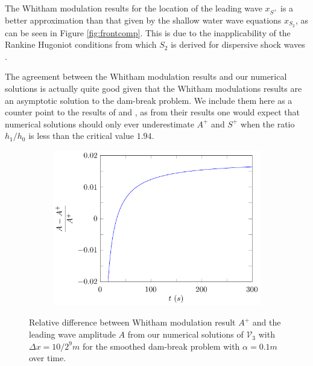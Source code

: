 \documentclass[times]{elsarticle}
\begin{document}
The Whitham modulation results for the location of the leading wave $x_{S^+}$ is a better approximation than that given by the shallow water wave equations $x_{S_2}$, as can be seen in Figure \ref{fig:frontcomp}. This is due to the inapplicability of the Rankine Hugoniot conditions from which $S_2$ is derived for dispersive shock waves \cite{El-Hoefer-2016-11}.

The agreement between the Whitham modulation results and our numerical solutions is actually quite good given that the Whitham modulations results are an asymptotic solution to the dam-break problem. We include them here as a counter point to the results of \citet{El-etal-2006} and \citet{Mitsotakis-etal-2014}, as from their results one would expect that numerical solutions should only ever underestimate $A^+$ and $S^+$ when the ratio $h_1/h_0$ is less than the critical value $1.94$.
\begin{figure}
	\centering
	\begin{subfigure}{0.5\textwidth}\centering
		\includegraphics[width=\textwidth]{Figure-36.pdf}
	\end{subfigure}%
	\caption{Relative difference between Whitham modulation result $A^+$ and the leading wave amplitude $A$ from our numerical solutions of $\mathcal{V}_3$ with $\Delta x = 10/2^{9}m$ for the smoothed dam-break problem with $\alpha = 0.1m$ over time.}
	\label{fig:amplitudefront}
\end{figure}
\end{document}
